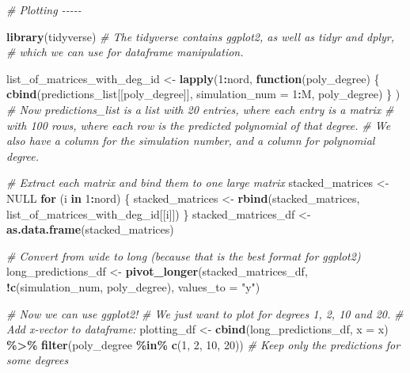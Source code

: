 \documentclass[
]{article}
\newenvironment{Shaded}{\begin{snugshade}}{\end{snugshade}}
\newcommand{\AttributeTok}[1]{\textcolor[rgb]{0.13,0.29,0.53}{#1}}
\newcommand{\CommentTok}[1]{\textcolor[rgb]{0.56,0.35,0.01}{\textit{#1}}}
\newcommand{\ConstantTok}[1]{\textcolor[rgb]{0.56,0.35,0.01}{#1}}
\newcommand{\ControlFlowTok}[1]{\textcolor[rgb]{0.13,0.29,0.53}{\textbf{#1}}}
\newcommand{\DecValTok}[1]{\textcolor[rgb]{0.00,0.00,0.81}{#1}}
\newcommand{\FunctionTok}[1]{\textcolor[rgb]{0.13,0.29,0.53}{\textbf{#1}}}
\newcommand{\NormalTok}[1]{#1}
\newcommand{\OtherTok}[1]{\textcolor[rgb]{0.56,0.35,0.01}{#1}}
\newcommand{\SpecialCharTok}[1]{\textcolor[rgb]{0.81,0.36,0.00}{\textbf{#1}}}
\newcommand{\StringTok}[1]{\textcolor[rgb]{0.31,0.60,0.02}{#1}}
\begin{document}
\begin{Shaded}
\begin{Highlighting}[]
\CommentTok{\# Plotting {-}{-}{-}{-}{-}}

\FunctionTok{library}\NormalTok{(tidyverse) }\CommentTok{\# The tidyverse contains ggplot2, as well as tidyr and dplyr, }
\CommentTok{\# which we can use for dataframe manipulation.}

\NormalTok{list\_of\_matrices\_with\_deg\_id }\OtherTok{\textless{}{-}} 
  \FunctionTok{lapply}\NormalTok{(}\DecValTok{1}\SpecialCharTok{:}\NormalTok{nord, }
         \ControlFlowTok{function}\NormalTok{(poly\_degree) \{}
           \FunctionTok{cbind}\NormalTok{(predictions\_list[[poly\_degree]],}
                 \AttributeTok{simulation\_num =} \DecValTok{1}\SpecialCharTok{:}\NormalTok{M,}
\NormalTok{                 poly\_degree)}
\NormalTok{         \}}
\NormalTok{  )}
\CommentTok{\# Now predictions\_list is a list with 20 entries, where each entry is a matrix }
\CommentTok{\# with 100 rows, where each row is the predicted polynomial of that degree.}
\CommentTok{\# We also have a column for the simulation number, and a column for polynomial degree.}

\CommentTok{\# Extract each matrix and bind them to one large matrix}
\NormalTok{stacked\_matrices }\OtherTok{\textless{}{-}}  \ConstantTok{NULL}
\ControlFlowTok{for}\NormalTok{ (i }\ControlFlowTok{in} \DecValTok{1}\SpecialCharTok{:}\NormalTok{nord) \{}
\NormalTok{  stacked\_matrices }\OtherTok{\textless{}{-}}
    \FunctionTok{rbind}\NormalTok{(stacked\_matrices, list\_of\_matrices\_with\_deg\_id[[i]])}
\NormalTok{\}}
\NormalTok{stacked\_matrices\_df }\OtherTok{\textless{}{-}} \FunctionTok{as.data.frame}\NormalTok{(stacked\_matrices)}

\CommentTok{\# Convert from wide to long (because that is the best format for ggplot2)}
\NormalTok{long\_predictions\_df }\OtherTok{\textless{}{-}} \FunctionTok{pivot\_longer}\NormalTok{(stacked\_matrices\_df, }
                                    \SpecialCharTok{!}\FunctionTok{c}\NormalTok{(simulation\_num, poly\_degree), }
                                    \AttributeTok{values\_to =} \StringTok{"y"}\NormalTok{)}

\CommentTok{\# Now we can use ggplot2!}
\CommentTok{\# We just want to plot for degrees 1, 2, 10 and 20.}
\CommentTok{\# Add x{-}vector to dataframe:}
\NormalTok{plotting\_df }\OtherTok{\textless{}{-}} \FunctionTok{cbind}\NormalTok{(long\_predictions\_df, }\AttributeTok{x =}\NormalTok{ x) }\SpecialCharTok{\%\textgreater{}\%} 
  \FunctionTok{filter}\NormalTok{(poly\_degree }\SpecialCharTok{\%in\%} \FunctionTok{c}\NormalTok{(}\DecValTok{1}\NormalTok{, }\DecValTok{2}\NormalTok{, }\DecValTok{10}\NormalTok{, }\DecValTok{20}\NormalTok{)) }\CommentTok{\# Keep only the predictions for some degrees}


\end{Highlighting}
\end{Shaded}
\end{document}
